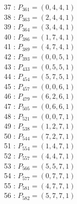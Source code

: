 \documentclass{article}
\begin{document}
{\begin{multicols}{3}
37 : $P_{361}=( 0, 4, 4, 1 )$\\
38 : $P_{363}=( 2, 4, 4, 1 )$\\
39 : $P_{364}=( 3, 4, 4, 1 )$\\
40 : $P_{386}=( 1, 7, 4, 1 )$\\
41 : $P_{389}=( 4, 7, 4, 1 )$\\
42 : $P_{393}=( 0, 0, 5, 1 )$\\
43 : $P_{433}=( 0, 5, 5, 1 )$\\
44 : $P_{454}=( 5, 7, 5, 1 )$\\
45 : $P_{457}=( 0, 0, 6, 1 )$\\
46 : $P_{479}=( 6, 2, 6, 1 )$\\
47 : $P_{505}=( 0, 6, 6, 1 )$\\
48 : $P_{521}=( 0, 0, 7, 1 )$\\
49 : $P_{538}=( 1, 2, 7, 1 )$\\
50 : $P_{544}=( 7, 2, 7, 1 )$\\
51 : $P_{554}=( 1, 4, 7, 1 )$\\
52 : $P_{557}=( 4, 4, 7, 1 )$\\
53 : $P_{566}=( 5, 5, 7, 1 )$\\
54 : $P_{577}=( 0, 7, 7, 1 )$\\
55 : $P_{581}=( 4, 7, 7, 1 )$\\
56 : $P_{582}=( 5, 7, 7, 1 )$\\
\end{multicols}


%


%


}%
\end{document}

